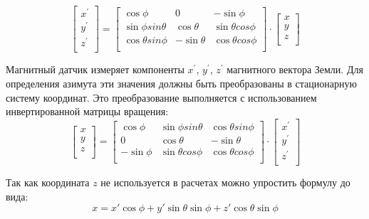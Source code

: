 \begin{equation}
    \label{eq:domain:magnetTiltExtendet}
    \begin{bmatrix} x^{'} \\ y^{'} \\ z^{'} \\ \end{bmatrix} = 
    \begin{bmatrix} \cos{\phi} & 0 & -\sin{\phi} \\ 
        \sin{\phi}sin{\theta} & \cos{\theta} & \sin{\theta}cos{\phi} \\ 
        \cos{\theta}sin{\phi} & -\sin{\theta} & \cos{\theta}cos{\phi} \\ 
    \end{bmatrix}
    \cdot
    \begin{bmatrix} x \\ y \\ z \\ \end{bmatrix}
    \end{equation} 

Магнитный датчик измеряет компоненты $x^{'}$, $y^{'}$, $z^{'}$  магнитного вектора Земли. 
Для определения азимута эти значения должны быть преобразованы в стационарную систему координат.
Это преобразование выполняется с использованием инвертированной матрицы вращения:
\begin{equation}
    \label{eq:domain:invMagnetTilt}
    \begin{bmatrix} x \\ y \\ z \\ \end{bmatrix} = 
    \begin{bmatrix} \cos{\phi} & \sin{\phi}sin{\theta} & \cos{\theta}sin{\phi} \\ 
        0 & \cos{\theta} & -\sin{\theta} \\ 
        -\sin{\phi} & \sin{\theta}cos{\phi}& \cos{\theta}cos{\phi} \\ 
    \end{bmatrix}
    \cdot
    \begin{bmatrix} x^{'} \\ y^{'} \\ z^{'} \\ \end{bmatrix}
    \end{equation} 

Так как координата $z$ не используется в расчетах можно упростить формулу до вида:
\begin{equation}
    \label{eq:domain:xMagnetTilt}
    x = x'\cos{\phi}+y'\sin{\theta}\sin{\phi}+z'\cos{\theta}\sin{\phi}
    \end{equation} 

